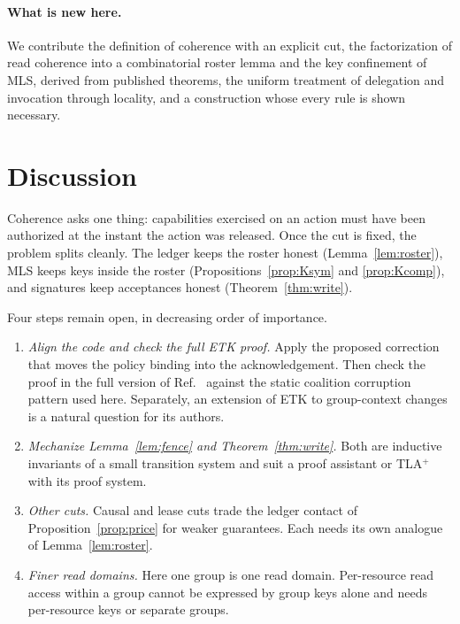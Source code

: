 \documentclass[aps,prx,reprint,superscriptaddress,nofootinbib,floatfix]{revtex4-2}
\theoremstyle{remark}
\begin{document}
\paragraph*{What is new here.} We contribute the definition of coherence with an explicit cut, the factorization of read coherence into a combinatorial roster lemma and the key confinement of MLS, derived from published theorems, the uniform treatment of delegation and invocation through locality, and a construction whose every rule is shown necessary.

\section{Discussion}\label{sec:discussion}

Coherence asks one thing: capabilities exercised on an action must have been authorized at the instant the action was released. Once the cut is fixed, the problem splits cleanly. The ledger keeps the roster honest (Lemma~\ref{lem:roster}), MLS keeps keys inside the roster (Propositions~\ref{prop:Ksym} and \ref{prop:Kcomp}), and signatures keep acceptances honest (Theorem~\ref{thm:write}).

Four steps remain open, in decreasing order of importance.
\begin{enumerate}
\item \emph{Align the code and check the full ETK proof.} Apply the proposed correction that moves the policy binding into the acknowledgement. Then check the proof in the full version of Ref.~\cite{etk} against the static coalition corruption pattern used here. Separately, an extension of ETK to group-context changes is a natural question for its authors.
\item \emph{Mechanize Lemma~\ref{lem:fence} and Theorem~\ref{thm:write}.} Both are inductive invariants of a small transition system and suit a proof assistant or TLA$^+$ with its proof system.
\item \emph{Other cuts.} Causal and lease cuts trade the ledger contact of Proposition~\ref{prop:price} for weaker guarantees. Each needs its own analogue of Lemma~\ref{lem:roster}.
\item \emph{Finer read domains.} Here one group is one read domain. Per-resource read access within a group cannot be expressed by group keys alone and needs per-resource keys or separate groups.
\end{enumerate}
\end{document}
